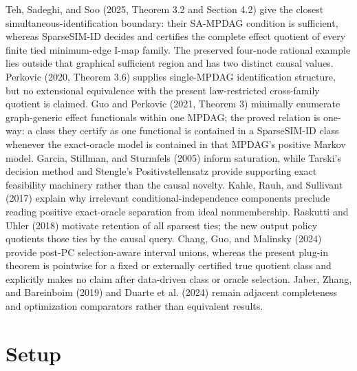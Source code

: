 \documentclass{article}
\begin{document}
Teh, Sadeghi, and Soo (2025, Theorem 3.2 and Section 4.2) give the closest simultaneous-identification boundary: their SA-MPDAG condition is sufficient, whereas SparseSIM-ID decides and certifies the complete effect quotient of every finite tied minimum-edge I-map family. The preserved four-node rational example lies outside that graphical sufficient region and has two distinct causal values. Perkovic (2020, Theorem 3.6) supplies single-MPDAG identification structure, but no extensional equivalence with the present law-restricted cross-family quotient is claimed. Guo and Perkovic (2021, Theorem 3) minimally enumerate graph-generic effect functionals within one MPDAG; the proved relation is one-way: a class they certify as one functional is contained in a SparseSIM-ID class whenever the exact-oracle model is contained in that MPDAG's positive Markov model. Garcia, Stillman, and Sturmfels (2005) inform saturation, while Tarski's decision method and Stengle's Positivstellensatz provide supporting exact feasibility machinery rather than the causal novelty. Kahle, Rauh, and Sullivant (2017) explain why irrelevant conditional-independence components preclude reading positive exact-oracle separation from ideal nonmembership. Raskutti and Uhler (2018) motivate retention of all sparsest ties; the new output policy quotients those ties by the causal query. Chang, Guo, and Malinsky (2024) provide post-PC selection-aware interval unions, whereas the present plug-in theorem is pointwise for a fixed or externally certified true quotient class and explicitly makes no claim after data-driven class or oracle selection. Jaber, Zhang, and Bareinboim (2019) and Duarte et al. (2024) remain adjacent completeness and optimization comparators rather than equivalent results.

\section{Setup}
\end{document}
